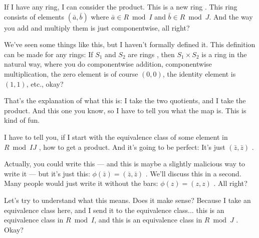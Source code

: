 \begin{speech}[01:19:50 - 01:21:59]
If I have any ring, I can consider the product. This is a new ring . This ring consists of elements $(\bar{a}, \bar{b})$ where $\bar{a} \in R \bmod I$ and $\bar{b} \in R \bmod J$. And the way you add and multiply them is just componentwise, all right?

We've seen some things like this, but I haven't formally defined it. This definition can be made for any rings: If $S_1$ and $S_2$ are rings , then $S_1 \times S_2$ is a ring in the natural way, where you do componentwise addition, componentwise multiplication, the zero element is of course $(0, 0)$, the identity element is $(1, 1)$, etc., okay?

That's the explanation of what this is: I take the two quotients, and I take the product. And this one you know, so I have to tell you what the map is. This is kind of fun.

I have to tell you, if I start with the equivalence class of some element in $R \bmod IJ$ , how to get a product. And it's going to be perfect: It's just $(\bar{z}, \bar{z})$ .

Actually, you could write this --- and this is maybe a slightly malicious way to write it --- but it's just this: $\phi(\bar{z}) = (\bar{z}, \bar{z})$ . We'll discuss this in a second. Many people would just write it without the bars: $\phi(z) = (z, z)$ . All right?

Let's try to understand what this means. Does it make sense? Because I take an equivalence class here, and I send it to the equivalence class... this is an equivalence class in $R \bmod I$, and this is an equivalence class in $R \bmod J$ . Okay?
\end{speech}

